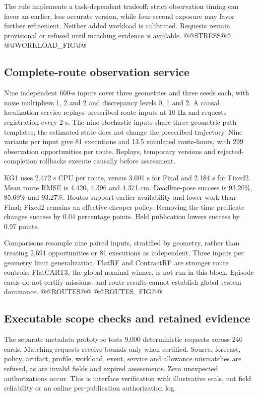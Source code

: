 The rule implements a task-dependent tradeoff: strict observation timing can favor an earlier, less accurate version, while four-second exposure may favor further refinement. Neither added workload is calibrated. Requests remain provisional or refused until matching evidence is available.
@@STRESS@@
@@WORKLOAD_FIG@@
\subsection{Complete-route observation service}
Nine independent 600-s inputs cover three geometries and three seeds each, with noise multipliers 1, 2 and 2 and discrepancy levels 0, 1 and 2. A causal localization service replays prescribed route inputs at 10 Hz and requests registration every 2 s. The nine stochastic inputs share three geometric path templates; the estimated state does not change the prescribed trajectory. Nine variants per input give 81 executions and 13.5 simulated route-hours, with 299 observation opportunities per route. Replays, temporary versions and rejected-completion rollbacks execute causally before assessment.

KG1 uses 2.472 s CPU per route, versus 3.001 s for Final and 2.184 s for Fixed2. Mean route RMSE is 4.420, 4.396 and 4.371 cm. Deadline-pose success is 93.20\%, 85.69\% and 93.27\%. Routes support earlier availability and lower work than Final; Fixed2 remains an effective cheaper policy. Removing the time predicate changes success by 0.04 percentage points. Held publication lowers success by 0.97 points.

Comparisons resample nine paired inputs, stratified by geometry, rather than treating 2,691 opportunities or 81 executions as independent. Three inputs per geometry limit generalization. FlatRF and ContractRF are stronger route controls; FlatCART3, the global nominal winner, is not run in this block. Episode cards do not certify missions, and route results cannot establish global system dominance.
@@ROUTES@@
@@ROUTES_FIG@@
\subsection{Executable scope checks and retained evidence}
The separate metadata prototype tests 9,000 deterministic requests across 240 cards. Matching requests receive bounds only when certified. Source, forecast, policy, artifact, profile, workload, event, service and allowance mismatches are refused, as are invalid fields and expired assessments. Zero unexpected authorizations occur. This is interface verification with illustrative seals, not field reliability or an online per-publication authorization log.

